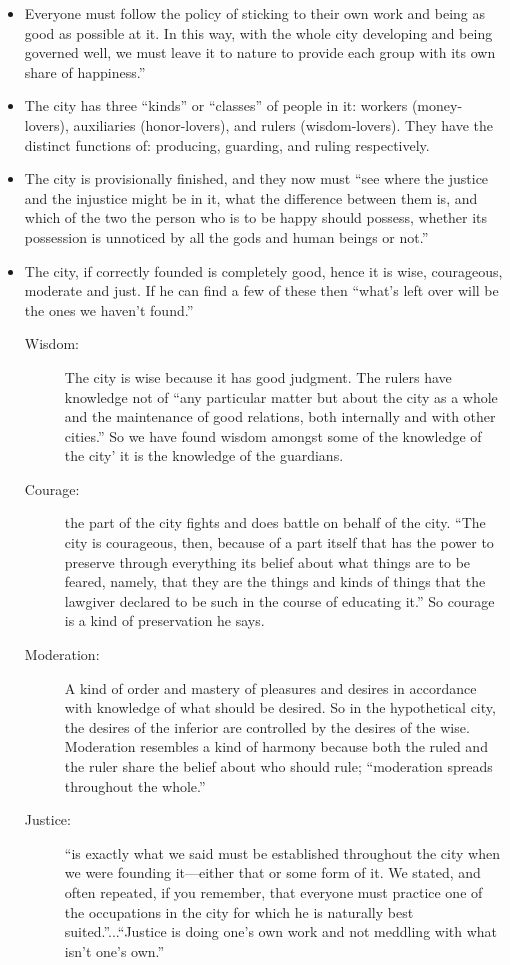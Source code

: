 \documentclass[oneside]{article}
\begin{document}
\begin{itemize}
\item  Everyone must follow the policy of sticking to their own work and being as good as possible at it. In this way, with the whole city developing and being governed well, we must leave it to nature to provide each group with its own share of happiness.''
\item The city has three ``kinds'' or ``classes'' of people in it: workers (money-lovers), auxiliaries (honor-lovers), and rulers (wisdom-lovers). They have the distinct functions of: producing, guarding, and ruling respectively.
\item The city is provisionally finished, and they now must ``see where the justice and the injustice might be in it, what the difference between them is, and which of the two the person who is to be happy should possess, whether its possession is unnoticed by all the gods and human beings or not.''
\item	The city, if correctly founded is completely good, hence it is wise, courageous, moderate and just. If he can find a few of these then ``what's left over will be the ones we haven't found.''
\begin{description}
\item[Wisdom:] The city is wise because it has good judgment. The rulers have knowledge not of ``any particular matter but about the city as a whole and the maintenance of good relations, both internally and with other cities.'' So we have found wisdom amongst some of the knowledge of the city' it is the knowledge of the guardians. 
\item[Courage:]  the part of the city fights and does battle on behalf of the city. ``The city is courageous, then, because of a part itself that has the power to preserve through everything its belief about what things are to be feared, namely, that they are the things and kinds of things that the lawgiver declared to be such in the course of educating it.'' So courage is a kind of preservation he says. 
\item[Moderation:] A kind of order and mastery of pleasures and desires in accordance with knowledge of what should be desired. So in the hypothetical city, the desires of the inferior are controlled by the desires of the  wise. Moderation resembles a kind of harmony because both the ruled and the ruler share the belief about who should rule; ``moderation spreads throughout the whole.''
\item[Justice:] ``is exactly what we said must be established throughout the city when we were founding it---either that or some form of it. We stated, and often repeated, if you remember, that everyone must practice one of the occupations in the city for which he is naturally best suited.''...``Justice is doing one's own work and not meddling with what isn't one's own.''

\end{description}
\end{itemize}
\end{document}
